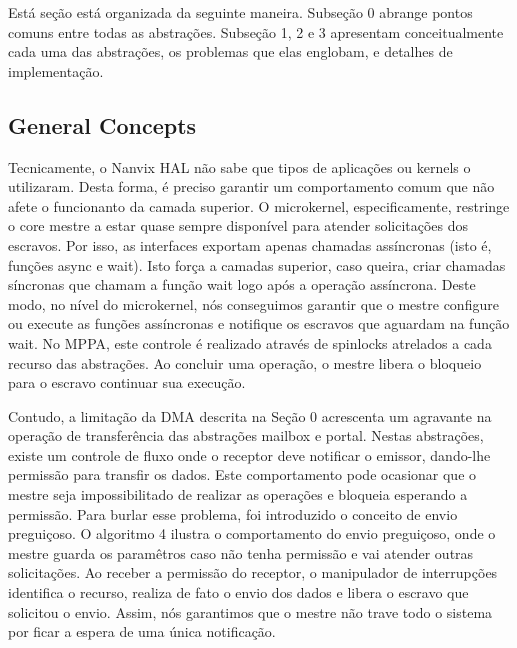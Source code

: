 		Está seção está organizada da seguinte maneira.
		Subseção 0 abrange pontos comuns entre todas as abstrações.
		Subseção 1, 2 e 3 apresentam conceitualmente cada uma das abstrações, os problemas que elas englobam, e detalhes de implementação.

		\subsection{General Concepts}
		\label{sec.general-concepts}

			Tecnicamente, o Nanvix HAL não sabe que tipos de aplicações ou kernels o utilizaram.
			Desta forma, é preciso garantir um comportamento comum que não afete o funcionanto da camada superior.
			O microkernel, especificamente, restringe o core mestre a estar quase sempre disponível para atender solicitações dos escravos.
			Por isso, as interfaces exportam apenas chamadas assíncronas (isto é, funções async e wait).
			Isto força a camadas superior, caso queira, criar chamadas síncronas que chamam a função wait logo após a operação assíncrona.
			Deste modo, no nível do microkernel, nós conseguimos garantir que o mestre configure ou execute as funções assíncronas e notifique os escravos que aguardam na função wait.
			No MPPA, este controle é realizado através de spinlocks atrelados a cada recurso das abstrações.
			Ao concluir uma operação, o mestre libera o bloqueio para o escravo continuar sua execução.

			Contudo, a limitação da DMA descrita na Seção 0 acrescenta um agravante na operação de transferência das abstrações mailbox e portal.
			Nestas abstrações, existe um controle de fluxo onde o receptor deve notificar o emissor, dando-lhe permissão para transfir os dados.
			Este comportamento pode ocasionar que o mestre seja impossibilitado de realizar as operações e bloqueia esperando a permissão.
			Para burlar esse problema, foi introduzido o conceito de envio preguiçoso.
			O algoritmo 4 ilustra o comportamento do envio preguiçoso, onde o mestre guarda os paramêtros caso não tenha permissão e vai atender outras solicitações.
			Ao receber a permissão do receptor, o manipulador de interrupções identifica o recurso, realiza de fato o envio dos dados e libera o escravo que solicitou o envio.
			Assim, nós garantimos que o mestre não trave todo o sistema por ficar a espera de uma única notificação.

